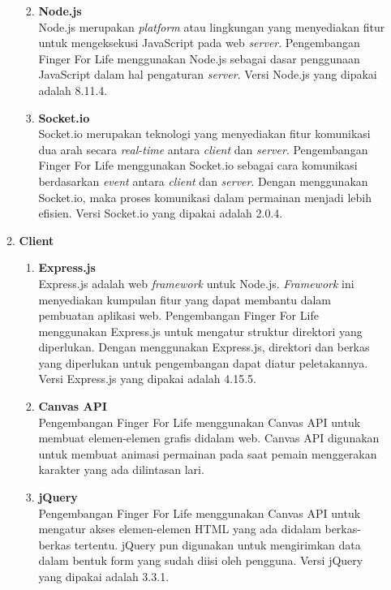 \begin{enumerate}
\begin{enumerate}
\begin{enumerate}
\begin{tabular}{ |p{1.5cm}|p{1.5cm}|p{2cm}|p{1.5cm}|p{1.5cm}|p{1.5cm}|p{1.5cm}|}
			\end{tabular}
			
			\item \textbf{Node.js} \\
			Node.js merupakan \textit{platform} atau lingkungan yang menyediakan fitur untuk mengeksekusi JavaScript pada web \textit{server}. Pengembangan Finger For Life menggunakan Node.js sebagai dasar penggunaan JavaScript dalam hal pengaturan \textit{server}. Versi Node.js yang dipakai adalah 8.11.4.
			
			\item \textbf{Socket.io} \\
			Socket.io merupakan teknologi yang menyediakan fitur komunikasi dua arah secara \textit{real-time} antara \textit{client} dan \textit{server}. Pengembangan Finger For Life menggunakan Socket.io sebagai cara komunikasi berdasarkan \textit{event} antara \textit{client} dan \textit{server}. Dengan menggunakan Socket.io, maka proses komunikasi dalam permainan menjadi lebih efisien. Versi Socket.io yang dipakai adalah 2.0.4.
			 
		\end{enumerate}
		
		\item \textbf{Client}
		\begin{enumerate}
			\item \textbf{Express.js} \\
			Express.js adalah web \textit{framework} untuk Node.js. \textit{Framework} ini menyediakan kumpulan fitur yang dapat membantu dalam pembuatan aplikasi web. Pengembangan Finger For Life menggunakan Express.js untuk mengatur struktur direktori yang diperlukan. Dengan menggunakan Express.js, direktori dan berkas yang diperlukan untuk pengembangan dapat diatur peletakannya. Versi Express.js yang dipakai adalah 4.15.5.
			
			\item \textbf{Canvas API} \\
			Pengembangan Finger For Life menggunakan Canvas API untuk membuat elemen-elemen grafis didalam web. Canvas API digunakan untuk membuat animasi permainan pada saat pemain menggerakan karakter yang ada dilintasan lari.
			
			\item \textbf{jQuery} \\
			Pengembangan Finger For Life menggunakan Canvas API untuk mengatur akses elemen-elemen HTML yang ada didalam berkas-berkas tertentu. jQuery pun digunakan untuk mengirimkan data dalam bentuk form yang sudah diisi oleh pengguna. Versi jQuery yang dipakai adalah 3.3.1.
			

\end{enumerate}
\end{enumerate}
\end{enumerate}
